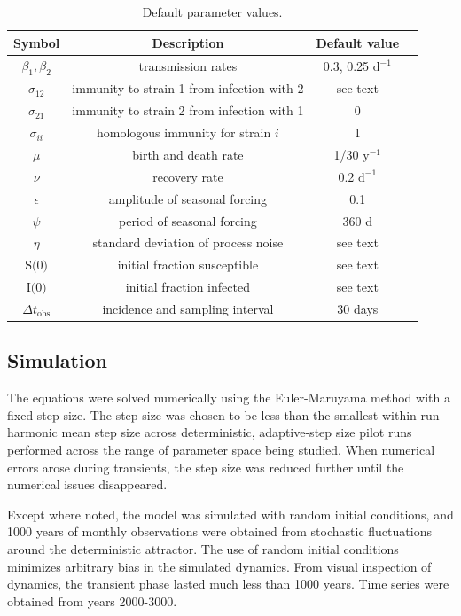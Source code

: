\begin{table}
\caption{Default parameter values.}
\begin{center}
\begin{tabular}{cccc}
{\bf Symbol} &{\bf Description} & {\bf Default value} \\ 
\hline
$\beta_1, \beta_2$ & transmission rates & 0.3, 0.25 $\text{d}^{-1}$ \\
$\sigma_{12}$ & immunity to strain 1 from infection with 2 & see text\\
$\sigma_{21}$ & immunity to strain 2 from infection with 1 & 0\\
$\sigma_{ii}$ & homologous immunity for strain $i$ & 1\\
$\mu$ & birth and death rate & 1/30 $\text{y}^{-1}$ \\
$\nu$ & recovery rate & 0.2 $\text{d}^{-1}$ \\
$\epsilon$ & amplitude of seasonal forcing & 0.1 \\
$\psi$ & period of seasonal forcing & 360 d\\
$\eta$ & standard deviation of process noise & see text \\
$\text{S(0)}$ & initial fraction susceptible & see text \\
$\text{I(0)}$ & initial fraction infected & see text\\
$\Delta t_\text{obs}$ & incidence and sampling interval & 30 days\\
\end {tabular}
\end{center}

\label{table:defaultParameters}
\end{table}

\subsection*{Simulation}

The equations were solved numerically using the Euler-Maruyama method with a fixed step size. 
The step size was chosen to be less than the smallest within-run harmonic mean step size across deterministic, adaptive-step size pilot runs performed across the range of parameter space being studied. 
When numerical errors arose during transients, the step size was reduced further until the numerical issues disappeared.

Except where noted, the model was simulated with random initial conditions, and 1000 years of monthly observations were obtained from stochastic fluctuations around the deterministic attractor.
The use of random initial conditions minimizes arbitrary bias in the simulated dynamics.
From visual inspection of dynamics, the transient phase lasted much less than 1000 years. Time series were obtained from years 2000-3000.


